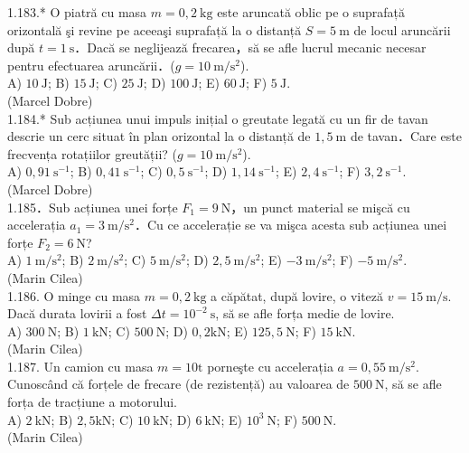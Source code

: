 1.183.* O piatră cu masa $m=0,2 \mathrm{~kg}$ este aruncată oblic pe o suprafață orizontală şi revine pe aceeaşi suprafață la o distanță $S=5 \mathrm{~m}$ de locul aruncării după $t=1 \mathrm{~s}$．Dacă se neglijează frecarea，să se afle lucrul mecanic necesar pentru efectuarea aruncării．($g=10 \mathrm{~m} / \mathrm{s}^{2}$).\\ A) $10 \mathrm{~J}$; B) $15 \mathrm{~J}$; C) $25 \mathrm{~J}$; D) $100 \mathrm{~J}$; E) $60 \mathrm{~J}$; F) $5 \mathrm{~J}$.\\ (Marcel Dobre)\\

1.184.* Sub acțiunea unui impuls inițial o greutate legată cu un fir de tavan descrie un cerc situat în plan orizontal la o distanță de $1,5 \mathrm{~m}$ de tavan．Care este frecvența rotațiilor greutății? ($g=10 \mathrm{~m} / \mathrm{s}^{2}$).\\ A) $0,91 \mathrm{~s}^{-1}$; B) $0,41 \mathrm{~s}^{-1}$; C) $0,5 \mathrm{~s}^{-1}$; D) $1,14 \mathrm{~s}^{-1}$; E) $2,4 \mathrm{~s}^{-1}$; F) $3,2 \mathrm{~s}^{-1}$.\\ (Marcel Dobre)\\

1.185．Sub acțiunea unei forțe $F_{1}=9 \mathrm{~N}$，un punct material se mişcă cu accelerația $a_{1}=3 \mathrm{~m} / \mathrm{s}^{2}$．Cu ce accelerație se va mişca acesta sub acțiunea unei forțe $F_{2}=6 \mathrm{~N}$?\\ A) $1 \mathrm{~m} / \mathrm{s}^{2}$; B) $2 \mathrm{~m} / \mathrm{s}^{2}$; C) $5 \mathrm{~m} / \mathrm{s}^{2}$; D) $2,5 \mathrm{~m} / \mathrm{s}^{2}$; E) $-3 \mathrm{~m} / \mathrm{s}^{2}$; F) $-5 \mathrm{~m} / \mathrm{s}^{2}$.\\ (Marin Cilea)\\

1.186. O minge cu masa $m=0,2 \mathrm{~kg}$ a căpătat, după lovire, o viteză $v=15 \mathrm{~m} / \mathrm{s}$. Dacă durata lovirii a fost $\Delta t=10^{-2} \mathrm{~s}$, să se afle forța medie de lovire.\\ A) $300 \mathrm{~N}$; B) $1 \mathrm{~kN}$; C) $500 \mathrm{~N}$; D) $0,2 \mathrm{kN}$; E) $125,5 \mathrm{~N}$; F) $15 \mathrm{~kN}$.\\ (Marin Cilea)\\

1.187. Un camion cu masa $m=10 \mathrm{t}$ porneşte cu accelerația $a=0,55 \mathrm{~m} / \mathrm{s}^{2}$. Cunoscând că forțele de frecare (de rezistență) au valoarea de $500 \mathrm{~N}$, să se afle forța de tracțiune a motorului.\\ A) $2 \mathrm{~kN}$; B) $2,5 \mathrm{kN}$; C) $10 \mathrm{~kN}$; D) $6 \mathrm{~kN}$; E) $10^{3} \mathrm{~N}$; F) $500 \mathrm{~N}$.\\ (Marin Cilea)\\


